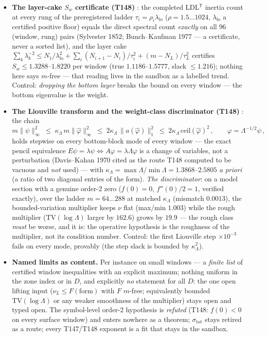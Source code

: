 \documentclass[11pt,a4paper]{article}
\begin{document}
\begin{itemize}[leftmargin=1.5em]
$\times10^{-3}$ fails on every window, a one-index $\mu$ shift breaks the coefficient identity
($1.5\times10^{-1}$).
\item \textbf{The layer-cake $S_w$ certificate (T148)} \mE: the completed LDL$^{\mathsf T}$
inertia count at every rung of the preregistered ladder $\tau_i=\rho_i\lambda_{\mathrm{lo}}$
($\rho=1.5\ldots1024$, $\lambda_{\mathrm{lo}}$ a certified positive floor) equals the direct
spectral count \emph{exactly} on all $96$ (window, rung) pairs (Sylvester 1852; Bunch--Kaufman
1977 --- a certificate, never a sorted list), and the layer cake
$\sum_k\lambda_k^{-2}\le N_1/\lambda_{\mathrm{lo}}^2+\sum_i(N_{i+1}{-}N_i)/\tau_i^2
+(m{-}N_L)/\tau_L^2$ certifies $S_w\le1.3288$--$1.8220$ per window (true
$1.1186$--$1.5777$, slack $\le1.216$); nothing here says $m$-free --- that reading lives in the
sandbox as a labelled trend. Control: \emph{dropping the bottom layer} breaks the bound on
every window --- the bottom eigenvalue is the weight.
\item \textbf{The Liouville transform and the weight-class discriminator (T148)} \mE: the chain
\[
m\|\psi\|_\infty^2\;\le\;\kappa_\Lambda\,m\|\hat\varphi\|_\infty^2
\;\le\;2\kappa_\Lambda\,\|a(\hat\varphi)\|_1^2
\;\le\;2\kappa_\Lambda\,\mathrm{ceil}(\hat\varphi)^2\,,\qquad
\varphi=\Lambda^{-1/2}\psi\,,
\]
holds stepwise on every bottom-block mode of every window --- the exact pencil equivalence
$E\psi=\lambda\psi\Leftrightarrow A\varphi=\lambda\Lambda\varphi$ is a change of variables, not
a perturbation (Davis--Kahan 1970 cited as the route T148 computed to be vacuous and \emph{not}
used) --- with $\kappa_\Lambda=\max\Lambda/\min\Lambda=1.3868$--$2.5805$ \emph{a priori} (a
ratio of two diagonal entries of the form). \emph{The discriminator}: on a model section with a
genuine order-2 zero ($f(0)=0$, $f''(0)/2=1$, verified exactly), over the ladder $m=64\ldots288$
at matched $\kappa_\Lambda$ (mismatch $0.0013$), the bounded-variation multiplier keeps $\nu$
flat (max/min $1.003$) while the rough multiplier ($\mathrm{TV}(\log\Lambda)$ larger by
$162.6$) grows by $19.9$ --- the rough class \emph{must} be worse, and it is: the operative
hypothesis is the roughness of the multiplier, not its condition number. Control: the first
Liouville step $\times10^{-3}$ fails on every mode, provably (the step slack is bounded by
$\kappa_\Lambda^2$).
\item \textbf{Named limits as content.} Per instance on small windows --- a \emph{finite list}
of certified window inequalities with an explicit maximum; nothing uniform in the zone index
or in $D$, and explicitly \emph{no} statement for all $D$: the one open lifting input
($\nu_L\le F(\text{form})$ with $F$ $m$-free; equivalently bounded $\mathrm{TV}(\log\Lambda)$
or any weaker smoothness of the multiplier) stays open and typed open. The symbol-level
order-2 hypothesis is \emph{refuted} (T148: $f(0)<0$ on every surface window) and enters
nowhere as a theorem; $\sigma_{\mathrm{tot}}$ stays retired as a route; every T147/T148
exponent is a fit that stays in the sandbox.
\end{itemize}
\end{document}
